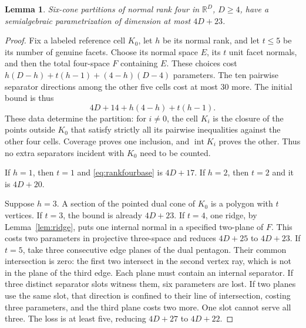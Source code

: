 \documentclass[a4paper,11pt,reqno]{amsart}
\newcommand{\R}{\mathbb R}
\newcommand{\intt}{\operatorname{int}}
\newtheorem{lemma}[theorem]{Lemma}
\theoremstyle{definition}
\theoremstyle{remark}
\numberwithin{equation}{section}
\begin{document}
\begin{lemma}\label{lem:rankfour}
Six-cone partitions of normal rank four in $\R^D$, $D\ge4$, have a
semialgebraic parametrization of dimension at most $4D+23$.
\end{lemma}
\begin{proof}
Fix a labeled reference cell $K_0$, let $h$ be its normal rank, and
let $t\le5$ be its number of genuine facets. Choose its normal space
$E$, its $t$ unit facet normals, and then the total four-space $F$
containing $E$. These choices cost
$h(D-h)+t(h-1)+(4-h)(D-4)$ parameters.
The ten pairwise separator directions among the other five cells
cost at most $30$ more. The initial bound is thus
\begin{equation}\label{eq:rankfourbase}
                  4D+14+h(4-h)+t(h-1).
\end{equation}
These data determine the partition: for $i\ne0$, the cell $K_i$ is
the closure of the points outside $K_0$ that satisfy strictly all its
pairwise inequalities against the other four cells. Coverage proves
one inclusion, and $\intt K_i$ proves the other. Thus no extra
separators incident with $K_0$ need to be counted.

If $h=1$, then $t=1$ and \eqref{eq:rankfourbase} is $4D+17$.
If $h=2$, then $t=2$ and it is $4D+20$.

Suppose $h=3$. A section of the pointed dual cone of $K_0$ is a polygon
with $t$ vertices. If $t=3$, the bound is already $4D+23$. If $t=4$,
one ridge, by Lemma~\ref{lem:ridge}, puts one internal normal in a
specified two-plane of $F$. This costs two parameters in projective
three-space and reduces $4D+25$ to $4D+23$.
If $t=5$, take three consecutive edge planes of the dual pentagon.
Their common intersection is zero: the first two intersect in the
second vertex ray, which is not in the plane of the third edge.
Each plane must contain an internal separator. If three distinct
separator slots witness them, six parameters are lost. If two planes
use the same slot, that direction is confined to their line of
intersection, costing three parameters, and the third plane costs
two more. One slot cannot serve all three. The loss is at least five,
reducing $4D+27$ to $4D+22$.


\end{proof}
\end{document}
